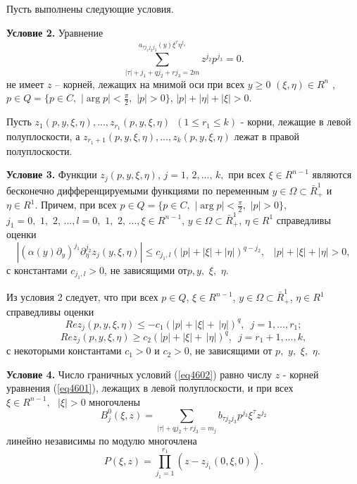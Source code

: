 Пусть выполнены следующие условия.

\textbf{Условие 2.} Уравнение
\[
\sum\limits_{\left| \tau \right| + j_1 + qj_2 + rj_3 = 2m}^ {a_{\tau j_1 j_2
j_3 } (y)\xi ^\tau \eta ^{j_1 }} z^{j_2 }p^{j_3 } = 0.
\]
не имеет $z$ -- корней, лежащих на мнимой оси при всех $y \ge 0\,\,(\xi
,\eta ) \in R^n\,\,$, $p \in Q = \{p \in C,\,\,\left| {\arg p} \right| <
\frac{\pi }{2},\,\,\left| p \right| > 0\}$, $\left| p \right| + \left| \eta
\right| + \left| \xi \right| > 0$.

Пусть $z_1 (p,y,\xi ,\eta ),...,z_{r_1 } (p,y,\xi ,\eta )\,\,\,(1 \le r_1
\le k)$ - корни, лежащие в левой полуплоскости, а $z_{r_1 + 1} (p,y,\xi
,\eta ),...,z_k (p,y,\xi ,\eta )$ лежат в правой полуплоскости.

\textbf{Условие 3.} Функции $z_j (p,y,\xi ,\eta )$, $j = 1,\,2,...,\,k,$ при
всех $\xi \in R^{n - 1}$ являются бесконечно дифференцируемыми функциями по
переменным $y \in \Omega \subset \bar {R}_ + ^1 $ и $\eta \in R^1$. Причем,
при всех $p \in Q = \{p \in C,\,\,\left| {\arg p} \right| < \frac{\pi
}{2},\,\,\left| p \right| > 0\}$, $j_1 = 0,\,\,1,\,\,2,\,...,l =
0,\,\,1,\,\,2,\,...,\xi \in R^{n - 1}$, $y \in \Omega \subset \bar {R}_ +
^1 $, $\eta \in R^1$ справедливы оценки
\[
\left| {(\alpha (y)\partial _y )^{j_1 }\partial _\eta ^{j_2 } z_j (y,\xi
,\eta )} \right| \le c_{j_1 ,l} (\left| p \right| + \left| \xi \right| +
\left| \eta \right|)^{q - j_2 },\,\,\,\,\,\left| p \right| + \left| \xi
\right| + \left| \eta \right| > 0,
\]
с константами $c_{j_1 ,l} > 0$, не зависящими от$p,y,\,\,\xi ,\,\,\eta .$

Из условия 2 следует, что при всех $p \in Q$, $\xi \in R^{n - 1}$, $y \in
\Omega \subset \bar {R}_ + ^1 $, $\eta \in R^1$ справедливы оценки
\[
Rez_j (p,y,\xi ,\eta ) \le - c_1 (\left| p \right| + \left| \xi \right| +
\,\left| \eta \right|)^q,\,\,\,j = 1,...,r_1 ;
\]
\[
Rez_j (p,y,\xi ,\eta ) \ge c_2 (\left| p \right| + \left| \xi \right| +
\,\left| \eta \right|)^q,\,\,\,j = r_1 + 1,...,k,
\]
с некоторыми константами $c_1 >0$
и $c_2 > 0$, не зависящими
от $p,\,\,y,\,\,\xi ,\,\,\eta $.

\textbf{Условие 4.} Число граничных условий (\ref{eq4602}) равно числу $z$ - корней
уравнения (\ref{eq4601}), лежащих в левой полуплоскости, и при всех $\xi \in R^{n -
1},\,\,\,\,\left| \xi \right| > 0$ многочлены
$$
	B_j^0 (\xi ,z) =
	\sum\limits_{\left| \tau \right| + qj_2 + rj_3 = m_j } {b_{\tau j_2 j_3 }
	p^{j_3 }} \xi ^\tau z^{j_2 }
$$
линейно независимы по модулю многочлена
$$
P(\xi ,z) = \prod\limits_{j_1 = 1}^{r_1 } {(z - z_{j_1 } (0,\xi ,0))} .
$$

